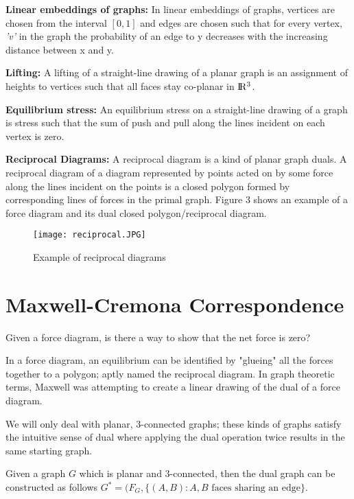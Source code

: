 \documentclass{article}
\begin{document}
    \textbf{Linear embeddings of graphs:} In linear embeddings of graphs, vertices are chosen from the interval $[0, 1]$ and edges are chosen such that for every vertex, \textit{'v'} in the graph the probability of an edge to y decreases with the increasing distance between x and y.
    
    \textbf{Lifting:} A lifting of a straight-line drawing of a planar graph is an assignment of heights to vertices such that all faces stay co-planar in ${\rm I\!R^3}$. 
    
    \textbf{Equilibrium stress:} An equilibrium stress on a straight-line drawing of a graph is stress such that the sum of push and pull along the lines incident on each vertex is zero.
    
    \textbf{Reciprocal Diagrams:} A reciprocal diagram is a kind of planar graph duals. A reciprocal diagram of a diagram represented by points acted on by some force along the lines incident on the points is a closed polygon formed by corresponding lines of forces in the primal graph. Figure 3 shows an example of a force diagram and its dual closed polygon/reciprocal diagram.
    
    \begin{figure}[H]
        \centering
        \texttt{[image: reciprocal.JPG]}
        \caption{Example of reciprocal diagrams}
        \label{fig:dual-example}
    \end{figure}
    
    
    \section{Maxwell-Cremona Correspondence}

    
    Given a force diagram, is there a way to show that the net force is zero?
    
    In a force diagram, an equilibrium can be identified by "glueing" all the forces together to a polygon; aptly named the reciprocal diagram. In graph theoretic terms, Maxwell was attempting to create a linear drawing of the dual of a force diagram.
    
    We will only deal with planar, 3-connected graphs; these kinds of graphs satisfy the intuitive sense of dual where applying the dual operation twice results in the same starting graph.
    
    \begin{corollary}[]
        Given a graph $G$ which is planar and 3-connected, then the dual graph can be constructed as follows $G^*=(F_G, \{(A,B): A,B \text{ faces sharing an edge} \}$.
    \end{corollary}
    
\end{document}
